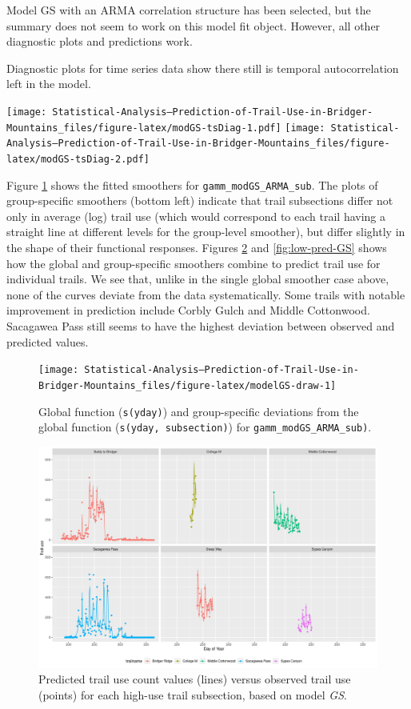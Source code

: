 \documentclass[
]{book}
\begin{document}
Model GS with an ARMA correlation structure has been selected, but the summary does not seem to work on this model fit object. However, all other diagnostic plots and predictions work.

Diagnostic plots for time series data show there still is temporal autocorrelation left in the model.

\texttt{[image: Statistical-Analysis--Prediction-of-Trail-Use-in-Bridger-Mountains\_files/figure-latex/modGS-tsDiag-1.pdf]} \texttt{[image: Statistical-Analysis--Prediction-of-Trail-Use-in-Bridger-Mountains\_files/figure-latex/modGS-tsDiag-2.pdf]}

Figure \ref{fig:modelGS-draw} shows the fitted smoothers for \texttt{gamm\_modGS\_ARMA\_sub}. The plots of group-specific smoothers (bottom left) indicate that trail subsections differ not only in average (log) trail use (which would correspond to each trail having a straight line at different levels for the group-level smoother), but differ slightly in the shape of their functional responses. Figures \ref{fig:high-pred-GS} and \ref{fig:low-pred-GS} shows how the global and group-specific smoothers combine to predict trail use for individual trails. We see that, unlike in the single global smoother case above, none of the curves deviate from the data systematically. Some trails with notable improvement in prediction include Corbly Gulch and Middle Cottonwood. Sacagawea Pass still seems to have the highest deviation between observed and predicted values.

\begin{figure}
\texttt{[image: Statistical-Analysis--Prediction-of-Trail-Use-in-Bridger-Mountains\_files/figure-latex/modelGS-draw-1]} \caption{Global function (\texttt{s(yday)}) and group-specific deviations from the global function (\texttt{s(yday, subsection)}) for \texttt{gamm\_modGS\_ARMA\_sub)}. }\label{fig:modelGS-draw}
\end{figure}

\begin{figure}

{\centering \includegraphics[width=1\linewidth]{../figures/high_pred_modGS} 

}

\caption{Predicted trail use count values (lines) versus observed trail use (points) for each high-use trail subsection, based on model \emph{GS}.}\label{fig:high-pred-GS}
\end{figure}
\end{document}
